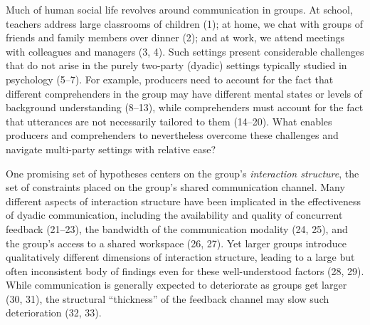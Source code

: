 \documentclass[9pt,twocolumn,twoside]{pnas-new}
\begin{document}



Much of human social life revolves around communication in groups. At
school, teachers address large classrooms of children (1); at home, we
chat with groups of friends and family members over dinner (2); and at
work, we attend meetings with colleagues and managers (3, 4). Such
settings present considerable challenges that do not arise in the purely
two-party (dyadic) settings typically studied in psychology (5--7). For
example, producers need to account for the fact that different
comprehenders in the group may have different mental states or levels of
background understanding (8--13), while comprehenders must account for
the fact that utterances are not necessarily tailored to them (14--20).
What enables producers and comprehenders to nevertheless overcome these
challenges and navigate multi-party settings with relative ease?

One promising set of hypotheses centers on the group's \emph{interaction
structure}, the set of constraints placed on the group's shared
communication channel. Many different aspects of interaction structure
have been implicated in the effectiveness of dyadic communication,
including the availability and quality of concurrent feedback (21--23),
the bandwidth of the communication modality (24, 25), and the group's
access to a shared workspace (26, 27). Yet larger groups introduce
qualitatively different dimensions of interaction structure, leading to
a large but often inconsistent body of findings even for these
well-understood factors (28, 29). While communication is generally
expected to deteriorate as groups get larger (30, 31), the structural
``thickness'' of the feedback channel may slow such deterioration (32,
33).
\end{document}
